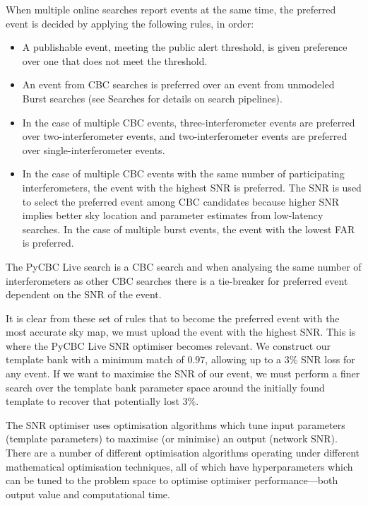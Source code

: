 When multiple online searches report events at the same time, the preferred event is decided by applying the following rules, in order:
%
\begin{itemize}
    \item A publishable event, meeting the public alert threshold, is given preference over one that does not meet the threshold.
    \item An event from CBC searches is preferred over an event from unmodeled Burst searches (see Searches for details on search pipelines).
    \item In the case of multiple CBC events, three-interferometer events are preferred over two-interferometer events, and two-interferometer events are preferred over single-interferometer events.
    \item In the case of multiple CBC events with the same number of participating interferometers, the event with the highest SNR is preferred. The SNR is used to select the preferred event among CBC candidates because higher SNR implies better sky location and parameter estimates from low-latency searches. In the case of multiple burst events, the event with the lowest FAR is preferred.
\end{itemize}
%
The PyCBC Live search is a CBC search and when analysing the same number of interferometers as other CBC searches there is a tie-breaker for preferred event dependent on the SNR of the event.

It is clear from these set of rules that to become the preferred event with the most accurate sky map, we must upload the event with the highest SNR. This is where the PyCBC Live SNR optimiser becomes relevant. We construct our template bank with a minimum match of $0.97$, allowing up to a $3\%$ SNR loss for any event. If we want to maximise the SNR of our event, we must perform a finer search over the template bank parameter space around the initially found template to recover that potentially lost $3\%$.

The SNR optimiser uses optimisation algorithms which tune input parameters (template parameters) to maximise (or minimise) an output (network SNR). There are a number of different optimisation algorithms operating under different mathematical optimisation techniques, all of which have hyperparameters which can be tuned to the problem space to optimise optimiser performance---both output value and computational time.


